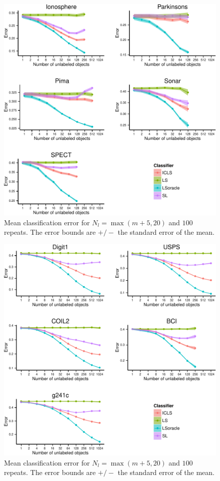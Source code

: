 \documentclass[smallcondensed]{svjour3}
\begin{document}
\begin{figure}[ht!] 
  \centering
      \includegraphics[width=1.0\textwidth]{LearningCurves-1.pdf}
  \caption{Mean classification error for $N_l=\max(m+5,20)$ and $100$ repeats. The error bounds are $+/-$ the standard error of the mean.} \label{fig:learningcurves1}
\end{figure}

\begin{figure}[ht!] 
  \centering
      \includegraphics[width=1.0\textwidth]{LearningCurves-2.pdf}
  \caption{Mean classification error for $N_l=\max(m+5,20)$ and $100$ repeats. The error bounds are $+/-$ the standard error of the mean.} \label{fig:learningcurves2}
\end{figure}
\end{document}
